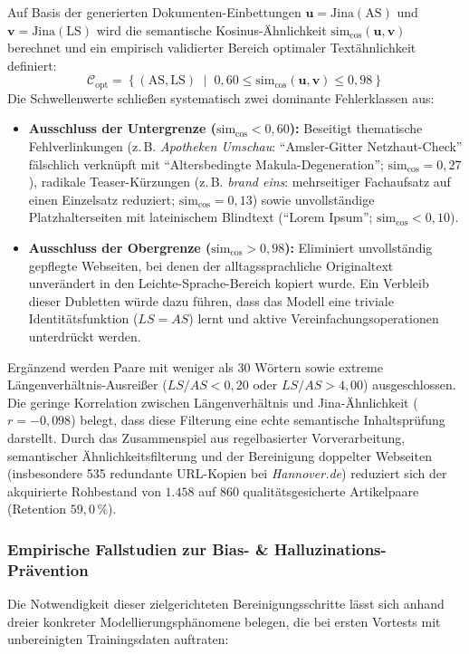 Auf Basis der generierten Dokumenten-Einbettungen $\mathbf{u} = \text{Jina}(\text{AS})$ und $\mathbf{v} = \text{Jina}(\text{LS})$ wird die semantische Kosinus-Ähnlichkeit $\text{sim}_{\cos}(\mathbf{u}, \mathbf{v})$ berechnet und ein empirisch validierter Bereich optimaler Textähnlichkeit definiert:
\begin{equation}
    \mathcal{C}_{\text{opt}} = \left\{ (\text{AS}, \text{LS}) \;\middle|\; 0{,}60 \le \text{sim}_{\cos}(\mathbf{u}, \mathbf{v}) \le 0{,}98 \right\}
\end{equation}
Die Schwellenwerte schließen systematisch zwei dominante Fehlerklassen aus:
\begin{itemize}
    \item \textbf{Ausschluss der Untergrenze ($\text{sim}_{\cos} < 0{,}60$):} Beseitigt thematische Fehlverlinkungen (z.\,B. \textit{Apotheken Umschau}: \enquote{Amsler-Gitter Netzhaut-Check} fälschlich verknüpft mit \enquote{Altersbedingte Makula-Degeneration}; $\text{sim}_{\cos} = 0{,}27$), radikale Teaser-Kürzungen (z.\,B. \textit{brand eins}: mehrseitiger Fachaufsatz auf einen Einzelsatz reduziert; $\text{sim}_{\cos} = 0{,}13$) sowie unvollständige Platzhalterseiten mit lateinischem Blindtext (\enquote{Lorem Ipsum}; $\text{sim}_{\cos} < 0{,}10$).
    \item \textbf{Ausschluss der Obergrenze ($\text{sim}_{\cos} > 0{,}98$):} Eliminiert unvollständig gepflegte Webseiten, bei denen der alltagssprachliche Originaltext unverändert in den Leichte-Sprache-Bereich kopiert wurde. Ein Verbleib dieser Dubletten würde dazu führen, dass das Modell eine triviale Identitätsfunktion ($LS = AS$) lernt und aktive Vereinfachungsoperationen unterdrückt werden.
\end{itemize}

Ergänzend werden Paare mit weniger als 30 Wörtern sowie extreme Längenverhältnis-Ausreißer ($LS/AS < 0{,}20$ oder $LS/AS > 4{,}00$) ausgeschlossen. Die geringe Korrelation zwischen Längenverhältnis und Jina-Ähnlichkeit ($r = -0{,}098$) belegt, dass diese Filterung eine echte semantische Inhaltsprüfung darstellt. Durch das Zusammenspiel aus regelbasierter Vorverarbeitung, semantischer Ähnlichkeitsfilterung und der Bereinigung doppelter Webseiten (insbesondere 535 redundante URL-Kopien bei \textit{Hannover.de}) reduziert sich der akquirierte Rohbestand von $1.458$ auf $860$ qualitätsgesicherte Artikelpaare (Retention $59{,}0\,\%$).

\subsubsection{Empirische Fallstudien zur Bias- \& Halluzinations-Prävention}
Die Notwendigkeit dieser zielgerichteten Bereinigungsschritte lässt sich anhand dreier konkreter Modellierungsphänomene belegen, die bei ersten Vortests mit unbereinigten Trainingsdaten auftraten:

